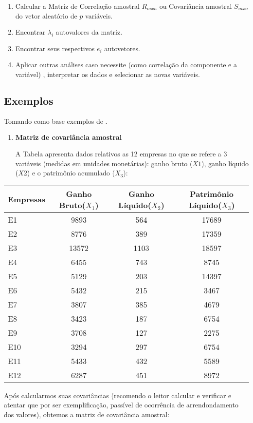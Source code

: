 \documentclass[
]{book}
\begin{document}
\begin{enumerate}
\def\labelenumi{\arabic{enumi}.}
\item
  Calcular a Matriz de Correlação amostral \(R_{mxn}\) ou Covariância amostral \(S_{mxn}\) do vetor aleatório de \(p\) variáveis.
\item
  Encontrar \(\lambda_i\) autovalores da matriz.
\item
  Encontrar seus respectivos \(e_i\) autovetores.
\item
  Aplicar outras análises caso necessite (como correlação da componente e a variável) , interpretar os dados e selecionar as novas variáveis.
\end{enumerate}

\hypertarget{exemplocp}{%
\subsection{Exemplos}\label{exemplocp}}

Tomando como base exemplos de \citet{mingoti2007analise}.

\begin{enumerate}
\def\labelenumi{\arabic{enumi}.}
\item
  \textbf{Matriz de covariância amostral}

  A Tabela apresenta dados relativos as 12 empresas no que se refere a 3 variáveis (medidas em unidades monetárias): ganho bruto (\(X1\)), ganho líquido (\(X2\)) e o patrimônio acumulado (\(X_3\)):
\end{enumerate}

\begin{longtable}[]{@{}lccc@{}}
\toprule
\textbf{Empresas} & \textbf{Ganho Bruto(\(X_1\))} & \textbf{Ganho Líquido(\(X_2\))} & \textbf{Patrimônio Líquido(\(X_3\))}\tabularnewline
\midrule
\endhead
E1 & 9893 & 564 & 17689\tabularnewline
E2 & 8776 & 389 & 17359\tabularnewline
E3 & 13572 & 1103 & 18597\tabularnewline
E4 & 6455 & 743 & 8745\tabularnewline
E5 & 5129 & 203 & 14397\tabularnewline
E6 & 5432 & 215 & 3467\tabularnewline
E7 & 3807 & 385 & 4679\tabularnewline
E8 & 3423 & 187 & 6754\tabularnewline
E9 & 3708 & 127 & 2275\tabularnewline
E10 & 3294 & 297 & 6754\tabularnewline
E11 & 5433 & 432 & 5589\tabularnewline
E12 & 6287 & 451 & 8972\tabularnewline
\bottomrule
\end{longtable}

Após calcularmos suas covariâncias (recomendo o leitor calcular e verificar e atentar que por ser exemplificação, passível de ocorrência de arrendondamento dos valores), obtemos a matriz de covariância amostral:
\end{document}
